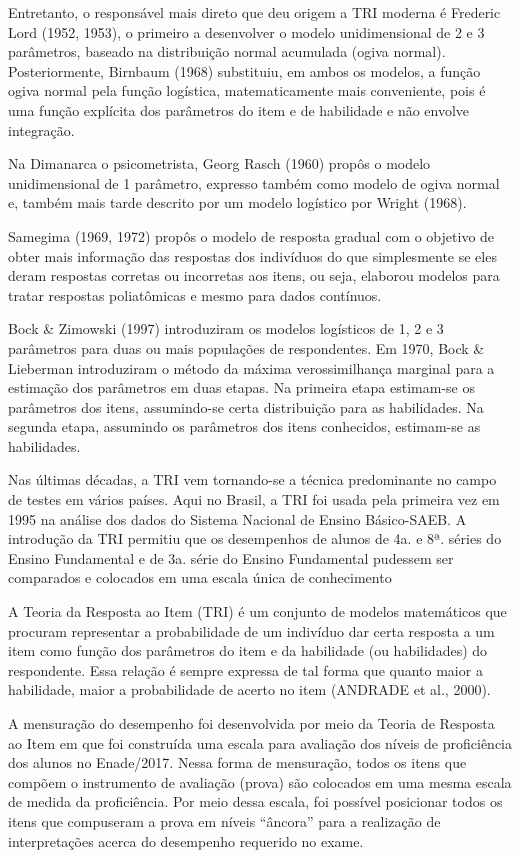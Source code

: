 \documentclass[12pt]{article}
\begin{document}
Entretanto, o responsável mais direto que deu origem a TRI moderna é Frederic Lord (1952, 1953), o primeiro a desenvolver o modelo unidimensional de 2 e 3 parâmetros, baseado na distribuição normal acumulada (ogiva normal). Posteriormente, Birnbaum (1968) substituiu, em ambos os modelos, a função ogiva normal pela função logística, matematicamente mais conveniente, pois é uma função explícita dos parâmetros do item e de habilidade e não envolve integração.

Na Dimanarca o psicometrista, Georg Rasch (1960) propôs o modelo unidimensional de 1 parâmetro, expresso também como modelo de ogiva normal e, também mais tarde descrito por um modelo logístico por Wright (1968). 

Samegima (1969, 1972) propôs o modelo de resposta gradual com o objetivo de obter mais informação das respostas dos indivíduos do que simplesmente se eles deram respostas corretas ou incorretas aos itens, ou seja, elaborou modelos para tratar respostas poliatômicas e mesmo para dados contínuos.

Bock \& Zimowski (1997) introduziram os modelos logísticos de 1, 2 e 3 parâmetros para duas ou mais populações de respondentes. Em 1970, Bock & Lieberman introduziram o método da máxima verossimilhança marginal para a estimação dos parâmetros em duas etapas. Na primeira etapa estimam-se os parâmetros dos itens, assumindo-se certa distribuição para as habilidades. Na segunda etapa, assumindo os parâmetros dos itens conhecidos, estimam-se as habilidades.

Nas últimas décadas, a TRI vem tornando-se a técnica predominante no campo de testes em vários países. Aqui no Brasil, a TRI foi usada pela primeira vez em 1995 na análise dos dados do Sistema Nacional de Ensino Básico-SAEB. A introdução da TRI permitiu que os desempenhos de alunos de 4a. e 8ª. séries do Ensino Fundamental e de 3a. série do Ensino Fundamental pudessem ser comparados e colocados em uma escala única de conhecimento


A Teoria da Resposta ao Item (TRI) é um conjunto de modelos matemáticos que procuram representar a probabilidade de um indivíduo dar certa resposta a um item como função dos parâmetros do item e da habilidade (ou habilidades) do respondente. Essa relação é sempre expressa de tal forma que quanto maior a habilidade, maior a probabilidade de acerto no item (ANDRADE et al., 2000).

A mensuração do desempenho foi desenvolvida por meio da Teoria de Resposta ao Item em que foi construída uma escala para avaliação dos níveis de proficiência dos alunos no Enade/2017. Nessa forma de mensuração, todos os itens que compõem o instrumento de avaliação (prova) são colocados em uma mesma escala de medida da proficiência. Por meio dessa escala, foi possível posicionar todos os itens que compuseram a prova em níveis “âncora” para a realização de interpretações acerca do desempenho requerido no exame.
\end{document}
